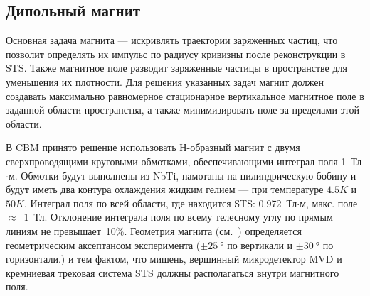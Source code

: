 
\subsection{Дипольный магнит}\label{sec:secMagnet}

Основная задача магнита --- искривлять траектории заряженных частиц, что позволит определять их импульс по радиусу кривизны после реконструкции в STS. Также магнитное поле разводит заряженные частицы в пространстве для уменьшения их плотности. Для решения указанных задач магнит должен создавать максимально равномерное стационарное вертикальное магнитное поле в заданной области пространства, а также минимизировать поле за пределами этой области.

В CBM принято решение использовать Н-образный магнит с двумя сверхпроводящими круговыми обмотками, обеспечивающими интеграл поля 1~Тл$\cdot$м. Обмотки будут выполнены из NbTi, намотаны на цилиндрическую бобину и будут иметь два контура охлаждения жидким гелием --- при температуре $4.5K$ и $50K$.
Интеграл поля по всей области, где находится STS: 0.972~Тл$\cdot$м, макс. поле $\approx$~1~Тл. Отклонение интеграла поля по всему телесному углу по прямым линиям не превышает~10\%.
Геометрия магнита (см.~) определяется геометрическим аксептансом эксперимента ($\pm \SI{25}{\degree}$ по вертикали и $\pm \SI{30}{\degree}$ по горизонтали.) и тем фактом, что мишень, вершинный микродетектор MVD и кремниевая трековая система STS должны располагаться внутри магнитного поля.

